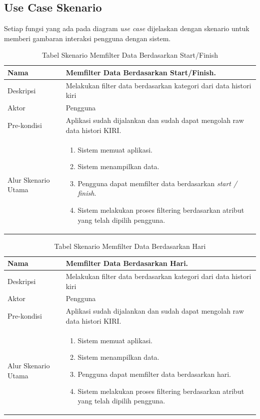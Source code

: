 \subsection{Use Case Skenario}
Setiap fungsi yang ada pada diagram \textit{use case} dijelaskan dengan skenario untuk memberi gambaran interaksi pengguna dengan sistem.
\begin{table}[H]
    \centering
    \caption{Tabel Skenario Memfilter Data Berdasarkan Start/Finish }
    \begin{tabular}{|p{3cm}|p{10cm}|}
    \hline
        Nama & Memfilter Data Berdasarkan Start/Finish.\\
    \hline
    \hline
        Deskripsi & Melakukan filter data berdasarkan kategori dari data histori kiri \\
    \hline
        Aktor & Pengguna \\
    \hline
        Pre-kondisi & Aplikasi sudah dijalankan dan sudah dapat mengolah raw data histori KIRI.\\
    \hline
        Alur Skenario Utama & 
        \begin{enumerate}
            \item Sistem memuat aplikasi.
            \item Sistem menampilkan data.
            \item Pengguna  dapat memfilter data berdasarkan \textit{start / finish}.
            \item Sistem melakukan proses filtering berdasarkan atribut yang telah dipilih pengguna.
        \end{enumerate}\\
    \hline
    \end{tabular}
    \label{tab:skenario1}
\end{table}
\begin{table}[H]
    \centering
    \caption{Tabel Skenario Memfilter Data Berdasarkan Hari }
    \begin{tabular}{|p{3cm}|p{10cm}|}
    \hline
        Nama & Memfilter Data Berdasarkan Hari.\\
    \hline
    \hline
        Deskripsi & Melakukan filter data berdasarkan kategori dari data histori kiri \\
    \hline
        Aktor & Pengguna \\
    \hline
        Pre-kondisi & Aplikasi sudah dijalankan dan sudah dapat mengolah raw data histori KIRI.\\
    \hline
        Alur Skenario Utama & 
        \begin{enumerate}
            \item Sistem memuat aplikasi.
            \item Sistem menampilkan data.
            \item Pengguna  dapat memfilter data berdasarkan hari.
            \item Sistem melakukan proses filtering berdasarkan atribut yang telah dipilih pengguna.
        \end{enumerate}\\
    \hline
    \end{tabular}
    \label{tab:skenario1}
\end{table}
